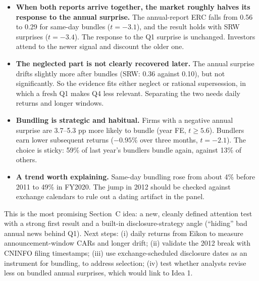 \begin{itemize}
\item \textbf{When both reports arrive together, the market roughly halves its response to the annual surprise.}
  The annual-report ERC falls from 0.56 to 0.29 for same-day bundles ($t=-3.1$), and the result holds with SRW
  surprises ($t=-3.4$). The response to the Q1 surprise is unchanged. Investors attend to the newer signal and
  discount the older one.
\item \textbf{The neglected part is not clearly recovered later.} The annual surprise drifts slightly more after
  bundles (SRW: 0.36 against 0.10), but not significantly. So the evidence fits either neglect or rational
  supersession, in which a fresh Q1 makes Q4 less relevant. Separating the two needs daily returns and longer
  windows.
\item \textbf{Bundling is strategic and habitual.} Firms with a negative annual surprise are 3.7--5.3 pp more likely
  to bundle (year FE, $t\geq5.6$). Bundlers earn lower subsequent returns ($-0.95\%$ over three months, $t=-2.1$).
  The choice is sticky: 59\% of last year's bundlers bundle again, against 13\% of others.
\item \textbf{A trend worth explaining.} Same-day bundling rose from about 4\% before 2011 to 49\% in FY2020. The jump
  in 2012 should be checked against exchange calendars to rule out a dating artifact in the panel.
\end{itemize}

This is the most promising Section~C idea: a new, cleanly defined attention test with a strong first result and a
built-in disclosure-strategy angle (``hiding'' bad annual news behind Q1). Next steps: (i) daily returns from Eikon
to measure announcement-window CARs and longer drift; (ii) validate the 2012 break with CNINFO filing timestamps;
(iii) use exchange-scheduled disclosure dates as an instrument for bundling, to address selection; (iv) test
whether analysts revise less on bundled annual surprises, which would link to Idea 1.

